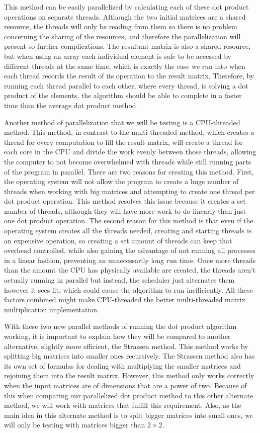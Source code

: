 \documentclass[conference]{IEEEtran}
\begin{document}
    This method can be easily parallelized by calculating each of these dot product operations on separate threads. Although the two initial matrices are a shared resource, the threads will only be reading from them so there is no problem concerning the sharing of the resources, and therefore the parallelization will present so further complications. The resultant matrix is also a shared resource, but when using an array each individual element is safe to be accessed by different threads at the same time, which is exactly the case we run into when each thread records the result of its operation to the result matrix. Therefore, by running each thread parallel to each other, where every thread, is solving a dot product of the elements, the algorithm should be able to complete in a faster time than the average dot product method.

    Another method of parallelization that we will be testing is a CPU-threaded method. This method, in contrast to the multi-threaded method, which creates a thread for every computation to fill the result matrix, will create a thread for each core in the CPU and divide the work evenly between those threads, allowing the computer to not become overwhelmed with threads while still running parts of the program in parallel. There are two reasons for creating this method. First, the operating system will not allow the program to create a huge number of threads when working with big matrices and attempting to create one thread per dot product operation. This method resolves this issue because it creates a set number of threads, although they will have more work to do linearly than just one dot product operation. The second reason for this method is that even if the operating system creates all the threads needed, creating and starting threads is an expensive operation, so creating a set amount of threads can keep that overhead controlled, while also gaining the advantage of not running all processes in a linear fashion, preventing an unnecessarily long run time. Once more threads than the amount the CPU has physically available are created, the threads aren't actually running in parallel but instead, the scheduler just alternates them however it sees fit, which could cause the algorithm to run inefficiently. All these factors combined might make CPU-threaded the better multi-threaded matrix multiplication implementation.
    
    With these two new parallel methods of running the dot product algorithm working, it is important to explain how they will be compared to another alternative, slightly more efficient, the Strassen method. This method works by splitting big matrices into smaller ones recursively. The Strassen method also has its own set of formulas for dealing with multiplying the smaller matrices and rejoining them into the result matrix. However, this method only works correctly when the input matrices are of dimensions that are a power of two. Because of this when comparing our parallelized dot product method to this other alternate method, we will work with matrices that fulfill this requirement. Also, as the main idea in this alternate method is to split bigger matrices into small ones, we will only be testing with matrices bigger than \(2 \times 2\). 
    
\end{document}
